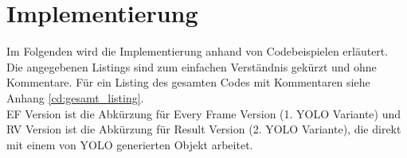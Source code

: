 \chapter{Implementierung} 
\label{ch:implementierung}


{\label{implementation_in_python}}
Im Folgenden wird die Implementierung anhand von Codebeispielen erläutert. Die angegebenen Listings sind zum einfachen Verständnis gekürzt und ohne Kommentare. Für ein Listing des gesamten Codes mit Kommentaren siehe Anhang \ref{cd:gesamt_listing}. \\
EF Version ist die Abkürzung für \glqq Every Frame\grqq{} Version (1. YOLO Variante) und RV Version ist die Abkürzung für \glqq Result\grqq{} Version (2. YOLO Variante), die direkt mit einem von YOLO generierten Objekt arbeitet. 
